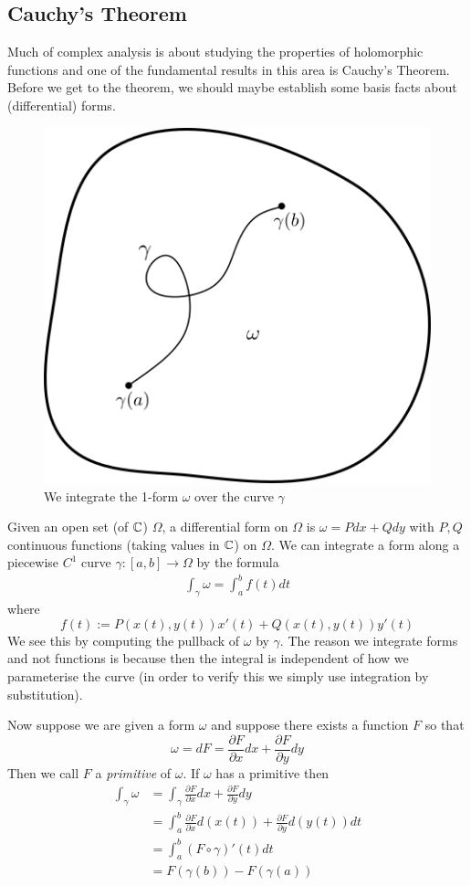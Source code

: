 \subsection{Cauchy's Theorem}
Much of complex analysis is about studying the properties of holomorphic functions and one of the fundamental results in this area is Cauchy's Theorem. Before we get to the theorem, we should maybe establish some basis facts about (differential) forms.

\begin{figure}[ht]
    \centering
    \includegraphics[scale=0.85]{Images/integrating_forms.png}
    \caption{We integrate the 1-form $\omega$ over the curve $\gamma$}
    \label{fig:integrating-forms}
\end{figure}

Given an open set (of $\mathbb{C}$) $\Omega$, a differential form on $\Omega$ is $\omega = Pdx + Qdy$ with $P, Q$ continuous functions (taking values in $\mathbb{C}$) on $\Omega$. We can integrate a form along a piecewise $C^1$ curve $\gamma: [a, b] \to \Omega$ by the formula
\begin{align*}
    \int_\gamma \omega = \int_a^b f(t) dt
\end{align*}
where
$$f(t) := P(x(t), y(t))x'(t) + Q(x(t), y(t)) y'(t)$$
We see this by computing the pullback of $\omega$ by $\gamma$. The reason we integrate forms and not functions is because then the integral is independent of how we parameterise the curve (in order to verify this we simply use integration by substitution).

Now suppose we are given a form $\omega$ and suppose there exists a function $F$ so that
$$\omega = dF = \frac{\partial F}{\partial x}dx + \frac{\partial F}{\partial y}dy$$
Then we call $F$ a \textit{primitive} of $\omega$. If $\omega$ has a primitive then
\begin{align*}
    \int_\gamma \omega &= \int_\gamma \frac{\partial F}{\partial x}dx + \frac{\partial F}{\partial y}dy\\
    &= \int_a^b \frac{\partial F}{\partial x}d(x(t)) + \frac{\partial F}{\partial y}d(y(t)) dt\\
    &= \int_a^b (F \circ \gamma)'(t) dt\\
    &= F(\gamma(b)) - F(\gamma(a))
\end{align*}

